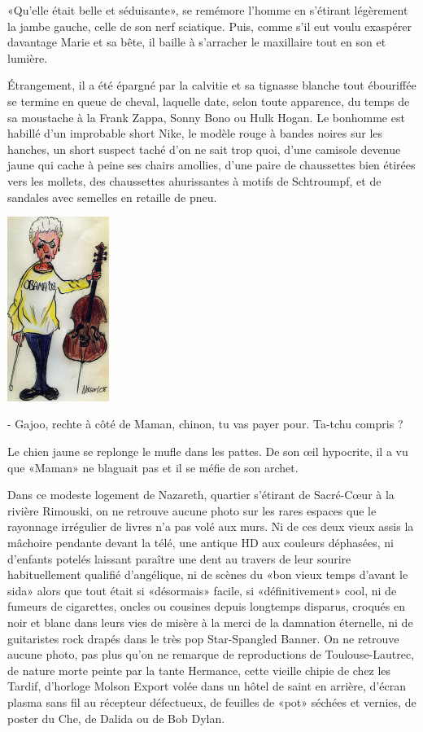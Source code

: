«Qu’elle était belle et séduisante», se remémore l’homme en s’étirant légèrement la jambe gauche, celle de son nerf sciatique. Puis, comme s’il eut voulu exaspérer davantage Marie et sa bête, il baille à s’arracher le maxillaire tout en son et lumière.

Étrangement, il a été épargné par la calvitie et sa tignasse blanche tout ébouriffée se termine en queue de cheval, laquelle date, selon toute apparence, du temps de sa moustache à la Frank Zappa, Sonny Bono ou Hulk Hogan. Le bonhomme est habillé d’un improbable short Nike, le modèle rouge à bandes noires sur les hanches, un short suspect taché d’on ne sait trop quoi, d’une camisole devenue jaune qui cache à peine ses chairs amollies, d’une paire de chaussettes bien étirées vers les mollets, des chaussettes ahurissantes à motifs de Schtroumpf, et de sandales avec semelles en retaille de pneu.

\begin{floatingfigure}[l]{40mm}
\includegraphics[height=60mm]{corps/chapitre1/img/maririou062.jpg}
\end{floatingfigure}

- Gajoo, rechte à côté de Maman, chinon, tu vas payer pour. Ta-tchu compris ?

Le chien jaune se replonge le mufle dans les pattes. De son œil hypocrite, il a vu que «Maman» ne blaguait pas et il se méfie de son archet.

Dans ce modeste logement de Nazareth, quartier s’étirant de Sacré-Cœur à la rivière Rimouski, on ne retrouve aucune photo sur les rares espaces que le rayonnage irrégulier de livres n’a pas volé aux murs. Ni de ces deux vieux assis la mâchoire pendante devant la télé, une antique HD aux couleurs déphasées, ni d’enfants potelés laissant paraître une dent au travers de leur sourire habituellement qualifié d’angélique, ni de scènes du «bon vieux temps d’avant le sida» alors que tout était si «désormais» facile, si «définitivement» cool, ni de fumeurs de cigarettes, oncles ou cousines depuis longtemps disparus, croqués en noir et blanc dans leurs vies de misère à la merci de la damnation éternelle, ni de guitaristes rock drapés dans le très pop Star-Spangled Banner. On ne retrouve aucune photo, pas plus qu’on ne remarque de reproductions de Toulouse-Lautrec, de nature morte peinte par la tante Hermance, cette vieille chipie de chez les Tardif, d’horloge Molson Export volée dans un hôtel de saint en arrière, d’écran plasma sans fil au récepteur défectueux, de feuilles de «pot» séchées et vernies, de poster du Che, de Dalida ou de Bob Dylan.

